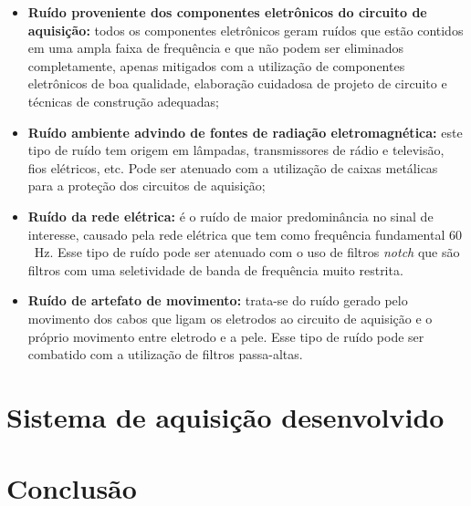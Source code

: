 \documentclass[a4paper,11pt]{article}
\begin{document}
\begin{itemize}
  \item \textbf{Ruído proveniente dos  componentes eletrônicos do circuito de aquisição:} todos os componentes eletrônicos geram ruídos que estão contidos em uma ampla faixa de frequência e que não podem ser eliminados completamente, apenas mitigados com a utilização de componentes eletrônicos de boa qualidade, elaboração cuidadosa de projeto de circuito e técnicas de construção adequadas;
  \item \textbf{Ruído ambiente advindo de fontes de radiação eletromagnética:} este tipo de ruído tem origem em lâmpadas, transmissores de rádio e televisão, fios elétricos, etc. Pode ser atenuado com a utilização de caixas metálicas para a proteção dos circuitos de aquisição;
  \item \textbf{Ruído da rede elétrica:} é o ruído de maior predominância no sinal de interesse, causado pela rede elétrica que tem como frequência fundamental $60$~Hz. Esse tipo de ruído pode ser atenuado com o uso de filtros \textit{notch} que são filtros com uma seletividade de banda de frequência muito restrita. 
  \item \textbf{Ruído de artefato de movimento:} trata-se do ruído gerado pelo movimento dos cabos que ligam os eletrodos ao circuito de aquisição e o próprio movimento entre eletrodo e a pele. Esse tipo de ruído pode ser combatido com a utilização de filtros passa-altas.
\end{itemize}
 
\section{Sistema de aquisição desenvolvido}
\label{sec:sist}
  
\section{Conclusão}
\label{sec:concl}
 
\printbibliography
\end{document}
